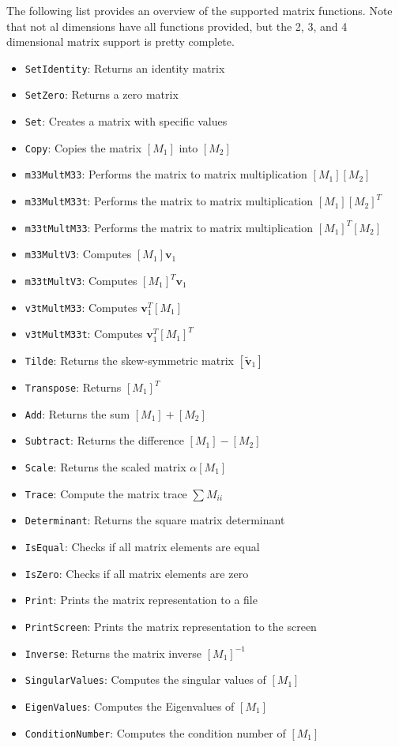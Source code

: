 The following list provides an overview of the supported matrix functions.  Note that not al dimensions have all functions provided, but the 2, 3, and 4 dimensional matrix support is pretty complete.
\begin{itemize}
	\item {\tt SetIdentity}: Returns an identity matrix
	\item {\tt SetZero}: Returns a zero matrix
	\item {\tt Set}: Creates a matrix with specific values
	\item {\tt Copy}: Copies the matrix $[M_{1}]$ into $[M_{2}]$
	\item {\tt m33MultM33}: Performs the matrix to matrix multiplication $[M_{1}][M_{2}]$
	\item {\tt m33MultM33t}: Performs the matrix to matrix multiplication $[M_{1}][M_{2}]^{T}$
	\item {\tt m33tMultM33}: Performs the matrix to matrix multiplication $[M_{1}]^{T}[M_{2}]$
	\item {\tt m33MultV3}: Computes $[M_{1}]\bm v_{1}$
	\item {\tt m33tMultV3}: Computes $[M_{1}]^{T}\bm v_{1}$
	\item {\tt v3tMultM33}: Computes $\bm v_{1}^{T}[M_{1}]$
	\item {\tt v3tMultM33t}: Computes  $\bm v_{1}^{T}[M_{1}]^{T}$
	\item {\tt Tilde}: Returns the skew-symmetric matrix $[\tilde{\bm v}_{1}]$
	\item {\tt Transpose}: Returns $[M_{1}]^{T}$
	\item {\tt Add}: Returns the sum $[M_{1}] + [M_{2}]$
	\item {\tt Subtract}: Returns the difference $[M_{1}] - [M_{2}]$
	\item {\tt Scale}: Returns the scaled matrix $\alpha [M_{1}]$
	\item {\tt Trace}: Compute the matrix trace $\sum M_{ii}$
	\item {\tt Determinant}: Returns the square matrix determinant
	\item {\tt IsEqual}: Checks if all matrix elements are equal
	\item {\tt IsZero}: Checks if all matrix elements are zero
	\item {\tt Print}: Prints the matrix representation to a file
	\item {\tt PrintScreen}: Prints the matrix representation to the screen
	\item {\tt Inverse}: Returns the matrix inverse $[M_{1}]^{-1}$
	\item {\tt SingularValues}: Computes the singular values of $[M_{1}]$
	\item {\tt EigenValues}: Computes the Eigenvalues of $[M_{1}]$
	\item {\tt ConditionNumber}: Computes the condition number of $[M_{1}]$
\end{itemize}




